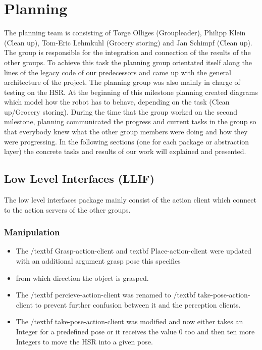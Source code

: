 \documentclass[main.tex]{subfiles}
\begin{document}
	
	\chapter{Planning}
		
                The planning team is consisting of Torge Olliges (Groupleader), Philipp Klein (Clean up), Tom-Eric Lehmkuhl (Grocery storing) and Jan Schimpf (Clean up). The group is responsible for the integration and connection of the results of the other groups. To achieve this task the planning group orientated itself along the lines of the legacy code of our predecessors and came up with the general architecture of the project. The planning group was also mainly in charge of testing on the HSR. At the beginning of this milestone planning created diagrams which model how the robot has to behave, depending on the task (Clean up/Grocery storing). During the time that the group worked on the second milestone, planning communicated the progress and current tasks in the group so that everybody knew what the other group members were doing and how they were progressing. In the following sections (one for each package or abstraction layer) the concrete tasks and results of our work will explained and presented.
		
                \section{Low Level Interfaces (LLIF)}
	                The low level interfaces package mainly consist of the action client which connect to the action servers of the other groups.
                
                \subsection{Manipulation}
	                \begin{itemize}
						\item The /textbf {Grasp-action-client} and textbf {Place-action-client} were updated with an additional argument grasp pose this specifies \item from which direction the object is grasped.
						\item The /textbf {percieve-action-client} was renamed to /textbf {take-pose-action-client} to prevent further confusion between it and the perception clients.
						\item The /textbf {take-pose-action-client} was modified and now either takes an Integer for a predefined pose or it receives the value 0 too and then ten more Integers to move the HSR into a given pose.
					\end{itemize}
\end{document}
